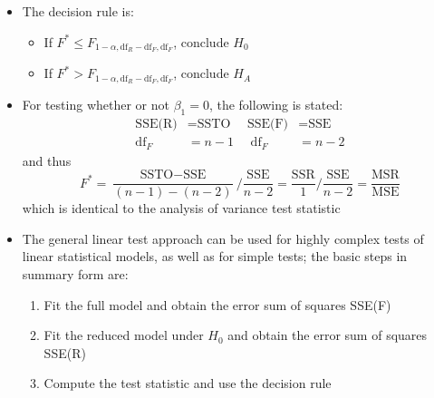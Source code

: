 \begin{itemize}
\item The decision rule is: \begin{itemize}
\item If $F^* \leq F_{1-\alpha, \text{df}_R - \text{df}_F, \text{df}_F}$, conclude $H_0$
\item If $F^* > F_{1-\alpha, \text{df}_R - \text{df}_F, \text{df}_F}$, conclude $H_A$ \end{itemize}
\item For testing whether or not $\beta_1 = 0$, the following is stated: $$ \begin{aligned} \text{SSE(R)} &= \text{SSTO} ~~~~~~ \text{SSE(F)} &= \text{SSE} \\ \text{df}_F &= n-1 ~~~~~~ \text{df}_F &= n-2 \end{aligned} $$ 
and thus $$ F^* = \frac{\text{SSTO} - \text{SSE}}{(n-1) - (n-2)} / \frac{\text{SSE}}{n-2} = \frac{\text{SSR}}{1} / \frac{\text{SSE}}{n-2} = \frac{\text{MSR}}{\text{MSE}} $$ which is identical to the analysis of variance test statistic 
\item The general linear test approach can be used for highly complex tests of linear statistical models, as well as for simple tests; the basic steps in summary form are: \begin{enumerate}
\item Fit the full model and obtain the error sum of squares SSE(F) 
\item Fit the reduced model under $H_0$ and obtain the error sum of squares SSE(R)
\item Compute the test statistic and use the decision rule \end{enumerate} 
\end{itemize}

